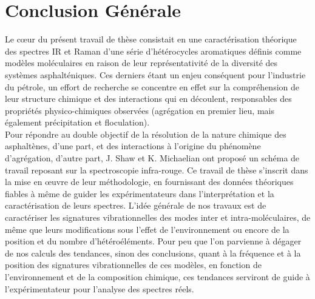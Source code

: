 	\chapter*{Conclusion Générale}
	\minitoc
	\restoregeometry
	
	
	
	Le cœur du présent travail de thèse consistait en une caractérisation théorique des spectres IR et Raman d'une série d'hétérocycles aromatiques définis comme modèles moléculaires en raison de leur représentativité de la diversité des systèmes asphalténiques. Ces derniers étant un enjeu conséquent pour l'industrie du pétrole, un effort de recherche se concentre en effet sur la compréhension de leur structure chimique et des interactions qui en découlent, responsables des propriétés physico-chimiques observées (agrégation en premier lieu, mais également précipitation et floculation).\\ 
	
	Pour répondre au double objectif de la résolution de la nature chimique des asphaltènes, d'une part, et des interactions à l'origine du phénomène d'agrégation, d'autre part, J. Shaw et K. Michaelian ont proposé un schéma de travail reposant sur la spectroscopie infra-rouge. Ce travail de thèse s'inscrit dans la mise en œuvre de leur méthodologie, en fournissant des données théoriques fiables à même de guider les expérimentateurs dans l'interprétation et la caractérisation de leurs spectres. L'idée générale de nos travaux est de caractériser les signatures vibrationnelles des modes inter et intra-moléculaires, de même que leurs modifications sous l'effet de l'environnement ou encore de la position et du nombre d'hétéroéléments. Pour peu que l'on parvienne à dégager de nos calculs des tendances, sinon des conclusions, quant à la fréquence et à la position des signatures vibrationnelles de ces modèles, en fonction de l'environnement et de la composition chimique, ces tendances serviront de guide à l'expérimentateur pour l'analyse des spectres réels.\\  
	
